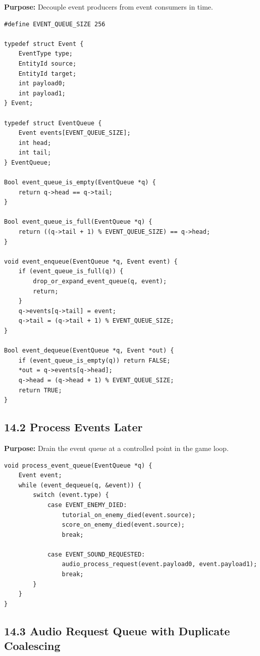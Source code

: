 \documentclass[10pt,letterpaper]{article}
\begin{document}
\textbf{Purpose:} Decouple event producers from event consumers in time.

\begin{verbatim}
#define EVENT_QUEUE_SIZE 256

typedef struct Event {
    EventType type;
    EntityId source;
    EntityId target;
    int payload0;
    int payload1;
} Event;

typedef struct EventQueue {
    Event events[EVENT_QUEUE_SIZE];
    int head;
    int tail;
} EventQueue;

Bool event_queue_is_empty(EventQueue *q) {
    return q->head == q->tail;
}

Bool event_queue_is_full(EventQueue *q) {
    return ((q->tail + 1) % EVENT_QUEUE_SIZE) == q->head;
}

void event_enqueue(EventQueue *q, Event event) {
    if (event_queue_is_full(q)) {
        drop_or_expand_event_queue(q, event);
        return;
    }
    q->events[q->tail] = event;
    q->tail = (q->tail + 1) % EVENT_QUEUE_SIZE;
}

Bool event_dequeue(EventQueue *q, Event *out) {
    if (event_queue_is_empty(q)) return FALSE;
    *out = q->events[q->head];
    q->head = (q->head + 1) % EVENT_QUEUE_SIZE;
    return TRUE;
}
\end{verbatim}

\subsection{14.2 Process Events Later}

\textbf{Purpose:} Drain the event queue at a controlled point in the game loop.

\begin{verbatim}
void process_event_queue(EventQueue *q) {
    Event event;
    while (event_dequeue(q, &event)) {
        switch (event.type) {
            case EVENT_ENEMY_DIED:
                tutorial_on_enemy_died(event.source);
                score_on_enemy_died(event.source);
                break;

            case EVENT_SOUND_REQUESTED:
                audio_process_request(event.payload0, event.payload1);
                break;
        }
    }
}
\end{verbatim}

\subsection{14.3 Audio Request Queue with Duplicate Coalescing}
\end{document}
